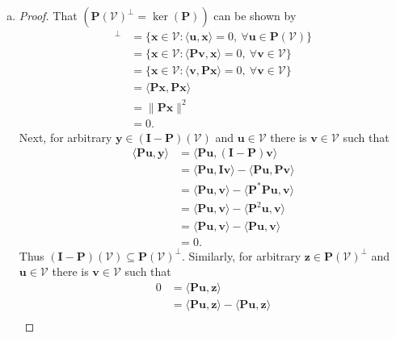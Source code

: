 \documentclass[12pt]{amsart}
\newcommand{\1}{\mathbbm{1}}
\numberwithin{equation}{section}
\numberwithin{Theorem}{section}
\theoremstyle{plain} %
\theoremstyle{definition}
\theoremstyle{remark}
\begin{document}
\begin{enumerate}[1.]
\begin{enumerate}[(a)]
	\item 
	\begin{proof}
		That
		\((\mathbf{P}(\mathcal{V})^{\bot} = \operatorname{ker}(\mathbf{P}))\)
		can be shown by
		\begin{align*}
			[\mathbf{P}(\mathcal{V})]^\perp
			&= \{\mathbf{x}\in\mathcal{V} : \langle \mathbf{u},\mathbf{x} \rangle =0, \ 
				\forall\mathbf{u}\in \mathbf{P}(\mathcal{V}) \} \\
			&= \{\mathbf{x}\in\mathcal{V} : \langle \mathbf{Pv}, \mathbf{x} \rangle =0, \ 
				\forall\mathbf{v}\in \mathcal{V} \} \\
			&= \{\mathbf{x}\in\mathcal{V} : \langle \mathbf{v}, \mathbf{Px} \rangle =0, \ 
				\forall\mathbf{v}\in \mathcal{V} \} \\
			&= \langle \mathbf{Px}, \mathbf{Px} \rangle  \\
			&= \|\mathbf{Px}\|^2 \\
			&= 0.
		\end{align*}
		Next, for arbitrary \(\mathbf{y}\in(\mathbf{I}-\mathbf{P})(\mathcal{V})\)
		and \(\mathbf{u}\in\mathcal{V}\) there is \(\mathbf{v}\in\mathcal{V}\)
		such that	
		\begin{align*}
			\langle \mathbf{P}\mathbf{u}, \mathbf{y} \rangle
			&= \langle \mathbf{P} \mathbf{u}, (\mathbf{I}-\mathbf{P}) \mathbf{v} \rangle \\
			&= \langle \mathbf{P} \mathbf{u}, \mathbf{I} \mathbf{v} \rangle - \langle \mathbf{P} \mathbf{u}, \mathbf{P} \mathbf{v} \rangle \\
			&= \langle \mathbf{P} \mathbf{u}, \mathbf{v} \rangle - \langle \mathbf{P^*} \mathbf{P} \mathbf{u}, \mathbf{v} \rangle \\
			&= \langle \mathbf{P} \mathbf{u}, \mathbf{v} \rangle - \langle \mathbf{P}^2 \mathbf{u}, \mathbf{v} \rangle \\
			&= \langle \mathbf{P} \mathbf{u}, \mathbf{v} \rangle - \langle \mathbf{P} \mathbf{u}, \mathbf{v} \rangle \\
			&= 0.
		\end{align*}
		Thus
		\((\mathbf{I}-\mathbf{P})(\mathcal{V}) \subseteq \mathbf{P}(\mathcal{V})^{\bot} \).
%
		Similarly, for arbitrary \(\mathbf{z}\in\mathbf{P}(\mathcal{V})^{\bot}\) 
		and \(\mathbf{u}\in\mathcal{V}\) there is \(\mathbf{v}\in\mathcal{V}\)
		such that	
		\begin{align*}
			0 &= \langle \mathbf{Pu}, \mathbf{z} \rangle \\
			&= \langle \mathbf{Pu}, \mathbf{z} \rangle - \langle \mathbf{Pu}, \mathbf{z} \rangle \\

\end{align*}
\end{proof}
\end{enumerate}
\end{enumerate}
\end{document}
